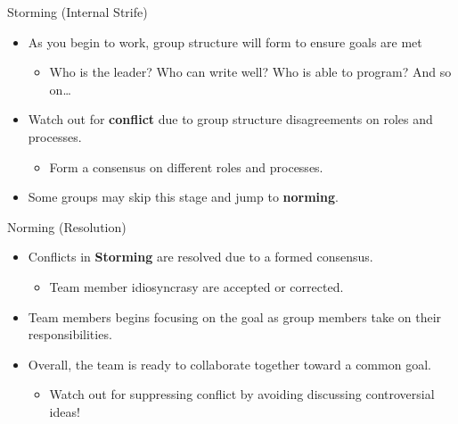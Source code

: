\begin{frame}{Storming (Internal Strife)}

\begin{itemize}
\tightlist
\item
  As you begin to work, group structure will form to ensure goals are
  met

  \begin{itemize}
  \tightlist
  \item
    Who is the leader? Who can write well? Who is able to program? And
    so on\ldots{}
  \end{itemize}
\item
  Watch out for \textbf{conflict} due to group structure disagreements
  on roles and processes.

  \begin{itemize}
  \tightlist
  \item
    Form a consensus on different roles and processes.
  \end{itemize}
\item
  Some groups may skip this stage and jump to \textbf{norming}.
\end{itemize}

\end{frame}

\begin{frame}{Norming (Resolution)}

\begin{itemize}
\tightlist
\item
  Conflicts in \textbf{Storming} are resolved due to a formed consensus.

  \begin{itemize}
  \tightlist
  \item
    Team member idiosyncrasy are accepted or corrected.
  \end{itemize}
\item
  Team members begins focusing on the goal as group members take on
  their responsibilities.
\item
  Overall, the team is ready to collaborate together toward a common
  goal.

  \begin{itemize}
  \tightlist
  \item
    Watch out for suppressing conflict by avoiding discussing
    controversial ideas!
  \end{itemize}
\end{itemize}

\end{frame}

